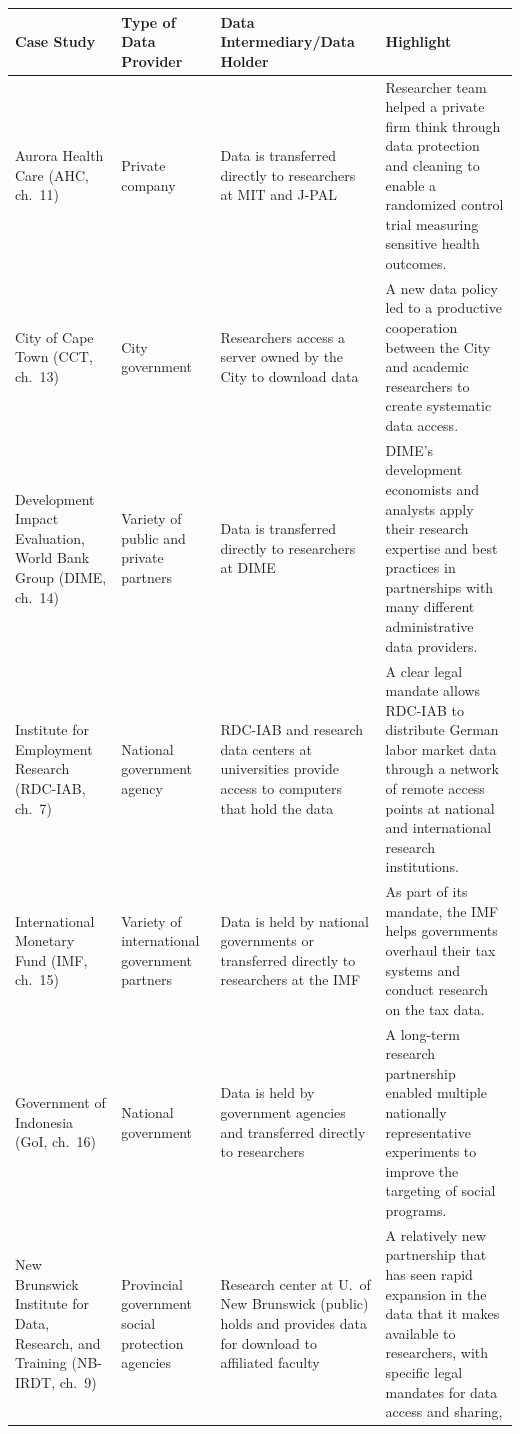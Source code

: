 \documentclass[11pt]{book}
\begin{document}
\begin{table}
\fontsize{10}{10}\selectfont
\begin{tabular}[t]{>{\raggedright\arraybackslash}p{12em}>{\raggedright\arraybackslash}p{8em}>{\raggedright\arraybackslash}p{20em}>{\raggedright\arraybackslash}p{24em}}
\toprule
Case Study & Type of Data Provider & Data Intermediary/Data Holder & Highlight\\
\midrule
Aurora Health Care (AHC, ch.\ 11) & Private company & Data is transferred directly to researchers at MIT and J-PAL & Researcher team helped a private firm think through data protection and cleaning to enable a randomized control trial measuring sensitive health outcomes.\\
City of Cape Town (CCT, ch.\ 13) & City government & Researchers access a server owned by the City to download data & A new data policy led to a productive cooperation between the City and academic researchers to create systematic data access.\\
Development Impact Evaluation, World Bank Group (DIME, ch.\ 14) & Variety of public and private partners & Data is transferred directly to researchers at DIME & DIME's development economists and analysts apply their research expertise and best practices in partnerships with many different administrative data providers.\\
Institute for Employment Research (RDC-IAB, ch.\ 7) & National government agency & RDC-IAB and research data centers at universities provide access to computers that hold the data & A clear legal mandate allows RDC-IAB to distribute German labor market data through a network of remote access points  at national and international research institutions.\\
International Monetary Fund (IMF, ch.\ 15) & Variety of international government partners & Data is held by national governments or transferred directly to researchers at the IMF & As part of its mandate, the IMF helps governments overhaul their tax systems and conduct research on the tax data.\\
\addlinespace
Government of Indonesia (GoI, ch.\ 16) & National government & Data is held by government agencies and transferred directly to researchers & A long-term research partnership enabled multiple nationally representative experiments to improve the targeting of social programs.\\
New Brunswick Institute for Data, Research, and Training (NB-IRDT, ch.\ 9) & Provincial government social protection agencies & Research center at  U.\ of New Brunswick (public) holds and provides data for download to affiliated faculty & A relatively new partnership that has seen rapid expansion in the data that it makes available to researchers, with specific legal mandates for data access and sharing,\\

\end{tabular}
\end{table}
\end{document}
